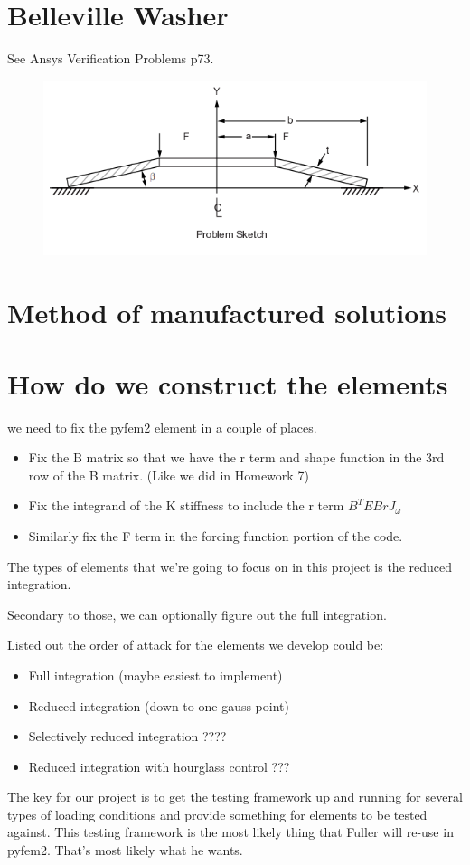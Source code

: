 \documentclass[10pt,letterpaper]{report}
\numberwithin{equation}{chapter}
\begin{document}
\chapter{Belleville Washer}

See Ansys Verification Problems p73.
\begin{figure}[!h]
\centering
\includegraphics[width=0.7\linewidth]{./Belleville}
\caption{}
\label{fig:Belleville}
\end{figure}


\chapter{Method of manufactured solutions}

\chapter{How do we construct the elements}
we need to fix the pyfem2 element in a couple of places.
\begin{itemize}
\item Fix the B matrix so that we have the r term and shape function in the 3rd row of the B matrix. (Like we did in Homework 7)
\item Fix the integrand of the K stiffness to include the r term $B^TEBrJ_\omega$
\item Similarly fix the F term in the forcing function portion of the code.
\end{itemize}

The types of elements that we're going to focus on in this project is the reduced integration.

Secondary to those, we can optionally figure out the full integration. 

Listed out the order of attack for the elements we develop could be:
\begin{itemize}
\item Full integration (maybe easiest to implement)
\item Reduced integration (down to one gauss point)
\item Selectively reduced integration ????
\item Reduced integration with hourglass control ???
\end{itemize}

The key for our project is to get the testing framework up and running for several types of loading conditions and provide something for elements to be tested against. This testing framework is the most likely thing that Fuller will re-use in pyfem2. That's most likely what he wants.
\end{document}
